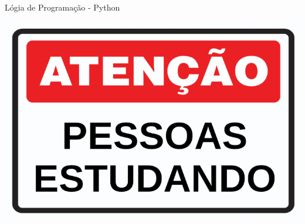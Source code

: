 \begin{frame}[t]{Lógia de Programação - Python}
	
	\vspace{1em}
	\fontsize{14pt}{19}\selectfont{
		Escreva utilizando Python.
	}\par
	
	\vspace{1em}
	
	\centering
	\includegraphics[scale=0.25]{imagens/fig-atencao-pessoas-estudando.png}
	
	
\end{frame}



